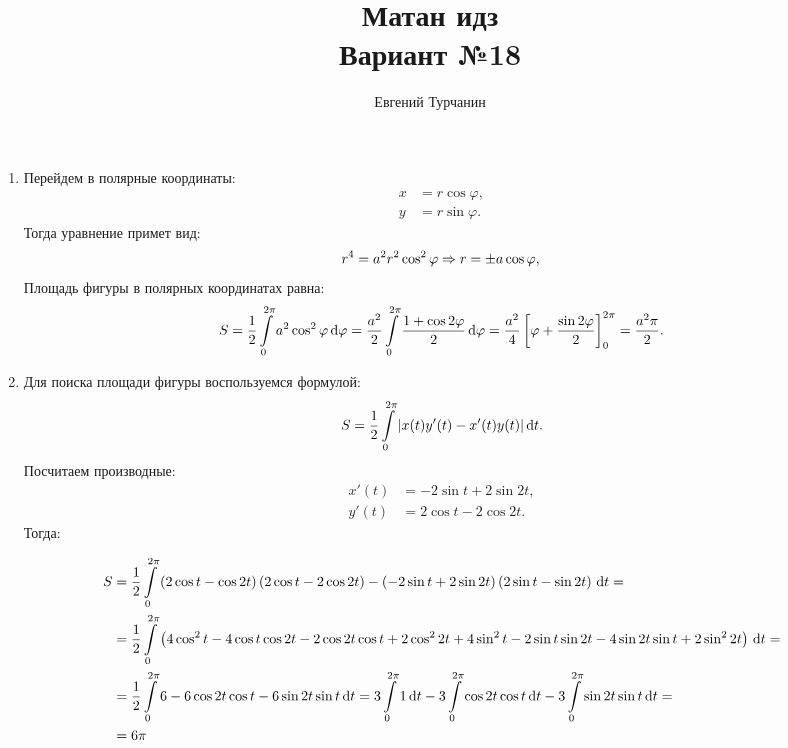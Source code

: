 \documentclass{report}
\title{\Huge{Матан идз}\\ Вариант №18}
\author{\huge{Евгений Турчанин}}
\date{}
\begin{document}
\maketitle
{}
\sol

\begin{enumerate}
\item Перейдем в полярные координаты:
\begin{align*}
    x &= r\cos\varphi, \\
    y &= r\sin\varphi.
\end{align*}
Тогда уравнение примет вид:
\[
    r^4 = a^2r^2\cos^2\varphi \Rightarrow r = \pm a\cos\varphi, \\
\]
Площадь фигуры в полярных координатах равна:
\[
    S = \frac{1}{2}\int\limits_{0}^{2\pi}a^2\cos^2\varphi \dl \varphi = \frac{a^2}{2}\int\limits_{0}^{2\pi}\frac{1+\cos 2\varphi}{2}\dl \varphi = \frac{a^2}{4}\left[\varphi + \frac{\sin 2\varphi}{2}\right]_0^{2\pi} = \frac{a^2\pi}{2}.
\]
\item Для поиска площади фигуры воспользуемся формулой:
\[
    S = \frac{1}{2}\int\limits_{0}^{2\pi}|x(t)y'(t) - x'(t)y(t)|\dl t.
\] 
Посчитаем производные:
\begin{align*}
    x'(t) &= -2\sin t + 2\sin 2t, \\
    y'(t) &= 2\cos t - 2\cos 2t.
\end{align*}
Тогда:

\begin{align*}
    S &= \frac{1}{2}\int\limits_{0}^{2\pi}\left(2\cos t-\cos 2t\right)\left(2\cos t - 2\cos 2t\right) - \left(-2\sin t + 2\sin 2t\right)\left(2\sin t - \sin 2t\right)\dl t =\\
    &= \frac{1}{2}\int\limits_{0}^{2\pi}\left(4\cos^2 t - 4\cos t\cos 2t - 2\cos 2t\cos t + 2\cos^2 2t + 4\sin^2 t - 2\sin t\sin 2t - 4\sin 2t\sin t + 2\sin^2 2t\right)\dl t =\\
    &= \frac{1}{2}\int\limits_{0}^{2\pi}6-6\cos 2t \cos t-6\sin 2t \sin t \dl t = 3\int\limits_{0}^{2\pi}1\dl t - 3\int\limits_{0}^{2\pi}\cos 2t \cos t \dl t - 3\int\limits_{0}^{2\pi}\sin 2t \sin t \dl t =\\
    &= 6\pi
\end{align*}
\end{enumerate}
\end{document}
